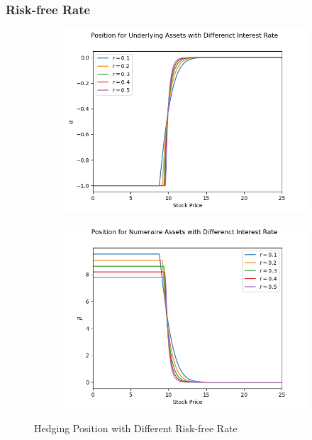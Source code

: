 \documentclass[12pt]{article}
\begin{document}
\subsubsection{Risk-free Rate}
\begin{figure}[H]
  \centering
  \begin{subfigure}{.5\textwidth}
    \centering
    \includegraphics[width=\linewidth]{3a-iii-r-alpha.png}
  \end{subfigure}%
  \begin{subfigure}{.5\textwidth}
    \centering
    \includegraphics[width=\linewidth]{3a-iii-r-beta.png}
  \end{subfigure}%
  \caption[Hedging Position with Different Risk-free Rate]{Hedging Position with Different Risk-free Rate}
\end{figure}
\end{document}
